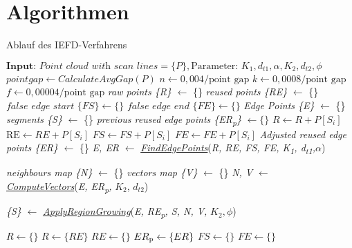 \appendix
\chapter{Algorithmen} \label{Algorithmen}
\begin{algorithm}
	\caption{Ablauf des IEFD-Verfahrens}
	\label{alg: IEFD_Ablauf}
	\begin{algorithmic}[1]
		\State $\textbf{Input: } \textit{Point cloud with scan lines} = \{P\}, \text{Parameter: } K_1, d_{t1}, \alpha, K_2, d_{t2}, \phi$
		\State $point gap \gets CalculateAvgGap(P)$
		\State $n \gets 0,004/\text{point gap}$
		\State $k \gets 0,0008/\text{point gap}$
		\State $f \gets 0,00004/\text{point gap}$
		\State \textit{raw points \{R\}} $\gets$ \{\}
		\State \textit{reused points \{RE\}} $\gets$ \{\}
		\State $\textit{false edge start \{FS\}} \gets \{\}$
		\State $\textit{false edge end \{FE\}} \gets\{\}$
		\State \textit{Edge Points \{E\}} $\gets$ \{\}
		\State \textit{segments \{S\}} $\gets$ \{\}
		\State \textit{previous reused edge points \{ER\textsubscript{p}\}} $\gets \{\}$
		\State $\textit{R} \gets \textit{R} + P[S_i]$
		\State$\text{RE} \gets \textit{RE} + P[S_i]$
		\EndIf
		\State $\textit{FS} \gets \textit{FS} + P[S_i]$
		\State $\textit{FE} \gets \textit{FE} + P[S_i]$
		\EndIf	
		\State \textit{Adjusted reused edge points \{ER\}} $\gets$ \{\}
		\State \textit{E, ER} $\gets$ \textit{\hyperref[alg:find_edge_points]{FindEdgePoints}}(\textit{R, RE, FS, FE, K\textsubscript{1}, d\textsubscript{t1},}$\alpha$)
		
		\State \textit{neighbours map \{N\}} $\gets$ \{\}
		\State \textit{vectors map \{V\}} $\gets$ \{\}
		\State \textit{N, V} $\gets$ \textit{\hyperref[alg:compute_vectors]{ComputeVectors}}(\textit{E, ER\textsubscript{p},} $K_2$, $d_{t2}$)
		
		\State \textit{\{S\}} $\gets$ \textit{\hyperref[alg:apply_region_growing]{ApplyRegionGrowing}}(\textit{E, RE\textsubscript{p}, S, N, V, } $K_2, \phi$)
		
		\State $R \gets \{\}$
		\State $R \gets \{RE\}$
		\State $RE \gets \{\}$
		\State $ER\textsubscript{p} \gets \{ER\}$
		\State $FS \gets \{\}$
		\State $FE \gets \{\}$
		\EndIf
		\EndFor
		
		
	\end{algorithmic}
\end{algorithm}

